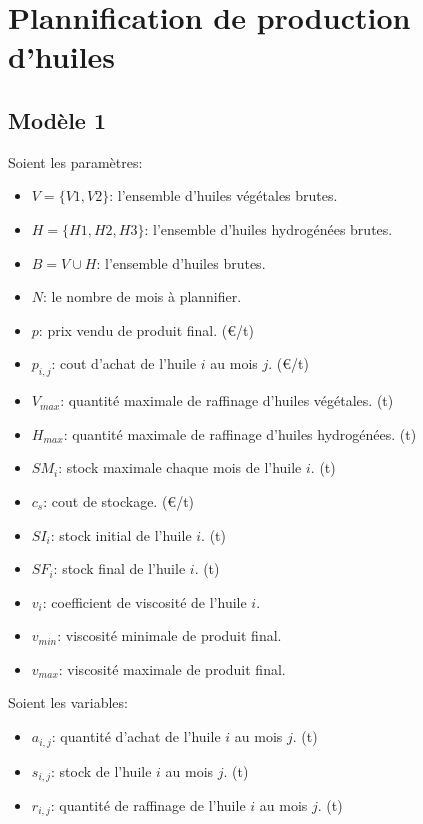 \documentclass[10pt,a4paper]{article}
\begin{document}
\section{Plannification de production d'huiles}

\subsection{Modèle 1}
Soient les paramètres:
\begin{itemize}
    \item $V = \{V1, V2\}$: l'ensemble d'huiles végétales brutes.
    \item $H = \{H1, H2, H3\}$: l'ensemble d'huiles hydrogénées brutes.
    \item $B = V \cup H$: l'ensemble d'huiles brutes.
    \item $N$: le nombre de mois à plannifier.
    \item $p$: prix vendu de produit final. (€/t)
    \item $p_{i,j}$: cout d'achat de l'huile $i$ au mois $j$. (€/t)
    \item $V_{max}$: quantité maximale de raffinage d'huiles végétales. (t)
    \item $H_{max}$: quantité maximale de raffinage d'huiles hydrogénées. (t)
    \item $SM_i$: stock maximale chaque mois de l'huile $i$. (t)
    \item $c_s$: cout de stockage. (€/t)
    \item $SI_i$: stock initial de l'huile $i$. (t)
    \item $SF_i$: stock final de l'huile $i$. (t)
    \item $v_i$: coefficient de viscosité de l'huile $i$.
    \item $v_{min}$: viscosité minimale de produit final.
    \item $v_{max}$: viscosité maximale de produit final.
\end{itemize}

Soient les variables:
\begin{itemize}
    \item $a_{i,j}$: quantité d'achat de l'huile $i$ au mois $j$. (t)
    \item $s_{i,j}$: stock de l'huile $i$ au mois $j$. (t)
    \item $r_{i,j}$: quantité de raffinage de l'huile $i$ au mois $j$. (t)
\end{itemize}
\end{document}
